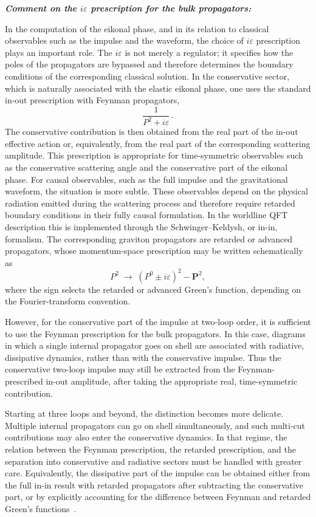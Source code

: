 {\color{black}
\textbf{\textit{Comment on the \(i\varepsilon\) prescription for the bulk propagators:}}

In the computation of the eikonal phase, and in its relation to classical observables such as the impulse and the waveform, the choice of \(i\varepsilon\) prescription plays an important role. The \(i\varepsilon\) is not merely a regulator; it specifies how the poles of the propagators are bypassed and therefore determines the boundary conditions of the corresponding classical solution. In the conservative sector, which is naturally associated with the elastic eikonal phase, one uses the standard in-out prescription with Feynman propagators,
\begin{equation}
    \frac{1}{P^2+i\varepsilon}\, .
\end{equation}
The conservative contribution is then obtained from the real part of the in-out effective action or, equivalently, from the real part of the corresponding scattering amplitude. This prescription is appropriate for time-symmetric observables such as the conservative scattering angle and the conservative part of the eikonal phase.
For causal observables, such as the full impulse and the gravitational waveform, the situation is more subtle. These observables depend on the physical radiation emitted during the scattering process and therefore require retarded boundary conditions in their fully causal formulation. In the worldline QFT description this is implemented through the Schwinger--Keldysh, or in-in, formalism. The corresponding graviton propagators are retarded or advanced propagators, whose momentum-space prescription may be written schematically as
\begin{equation}
    P^2
    \;\longrightarrow\;
    (P^0\pm i\varepsilon)^2-\mathbf{P}^2 ,
\end{equation}
where the sign selects the retarded or advanced Green's function, depending on the Fourier-transform convention.

However, for the conservative part of the impulse at two-loop order, it is sufficient to use the Feynman prescription for the bulk propagators. In this case, diagrams in which a single internal propagator goes on shell are associated with radiative, dissipative dynamics, rather than with the conservative impulse. Thus the conservative two-loop impulse may still be extracted from the Feynman-prescribed in-out amplitude, after taking the appropriate real, time-symmetric contribution.

Starting at three loops and beyond, the distinction becomes more delicate. Multiple internal propagators can go on shell simultaneously, and such multi-cut contributions may also enter the conservative dynamics. In that regime, the relation between the Feynman prescription, the retarded prescription, and the separation into conservative and radiative sectors must be handled with greater care. Equivalently, the dissipative part of the impulse can be obtained either from the full in-in result with retarded propagators after subtracting the conservative part, or by explicitly accounting for the difference between Feynman and retarded Green's functions~\cite{Jakobsen:2022psy}.

}
